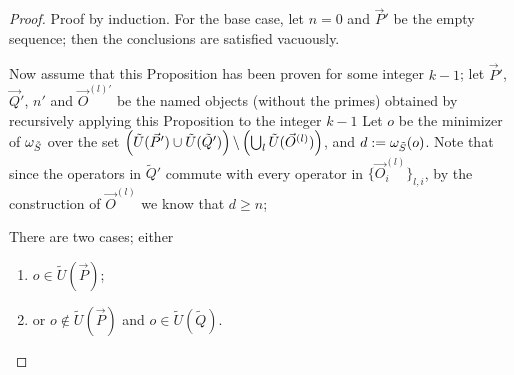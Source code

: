 \documentclass[twocolumn,showpacs,preprintnumbers,amsmath,amssymb,nofootinbib,pra,floatfix]{revtex4-1}
\newcommand{\lst}{\vec}
\newcommand{\set}{\tilde}
\begin{document}
\begin{proof}
Proof by induction.  For the base case, let $n=0$ and $\lst P'$ be the empty sequence;  then the conclusions are satisfied vacuously.

Now assume that this Proposition has been proven for some integer $k-1$;  let $\lst P'$, $\lst Q'$, $n'$ and $\lst O^{(l)'}$ be the named objects (without the primes) obtained by recursively applying this Proposition to the integer $k-1$  Let $o$ be the minimizer of $\om_{\set S}$ over the set $\paren{\set U(\lst P') \cup \set U(\set Q')} \backslash \paren{\bigcup_l \set U(\lst O^{(l)})}$, and $d:=\om_{\set S}(o)$.  Note that since the operators in $\set Q'$ commute with every operator in $\{\lst O^{(l)}_i\}_{l,i}$, by the construction of $\lst O^{(l)}$ we know that $d\ge n$;

There are two cases;  either
\begin{enumerate}
\item $o\in \set U(\lst P)$;
\item or $o\notin \set U(\lst P)$ and $o\in\set U(\set Q)$.
\end{enumerate}

\begin{description}


\end{description}
\end{proof}
\end{document}
